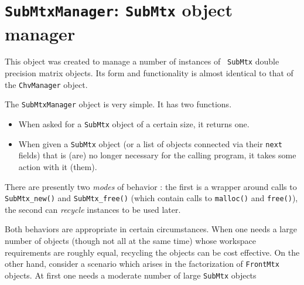 \par
\chapter{{\tt SubMtxManager}: {\tt SubMtx} object manager}
\par
This object was created to manage a number of instances of {\tt
SubMtx} double precision matrix objects. 
Its form and functionality is almost identical to that of the 
{\tt ChvManager} object.
\par
The {\tt SubMtxManager} object is very simple.
It has two functions.
\begin{itemize}
\item
When asked for a {\tt SubMtx} object of a certain size,
it returns one.
\item
When given a {\tt SubMtx} object (or a list of objects connected via
their {\tt next} fields) that is (are) no longer necessary for the
calling program, it takes some action with it (them).
\end{itemize}
There are presently two {\it modes} of behavior :
the first is a wrapper around calls to
{\tt SubMtx\_new()} and {\tt SubMtx\_free()}
(which contain calls to {\tt malloc()} and {\tt free()}),
the second can {\it recycle} instances to be used later.
\par
Both behaviors are appropriate in certain circumstances.
When one needs a large number of objects (though not all
at the same time) whose workspace requirements are roughly equal,
recycling the objects can be cost effective.
On the other hand, consider a scenario which arises in the
factorization of {\tt FrontMtx} objects. 
At first one needs a moderate number of large {\tt SubMtx} objects
